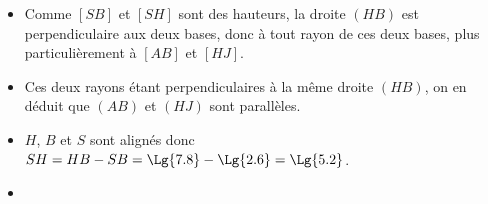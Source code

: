 \begin{corrige}
    \phantom{rrr}

    \begin{itemize}

    \item Comme $[SB]$ et $[SH]$ sont des hauteurs, la droite $(HB)$ est perpendiculaire aux deux bases, donc
    à tout rayon de ces deux bases, plus particulièrement à $[AB]$ et $[HJ]$.

    \item Ces deux rayons étant perpendiculaires à la même droite $(HB)$, on en déduit que $(AB)$ et $(HJ)$ sont parallèles.

    \item $H$, $B$ et $S$ sont alignés donc $SH = HB - SB = \Lg{7.8} - \Lg{2.6} = \Lg{5.2}$.

    \item {}
    \end{itemize}

\end{corrige}

